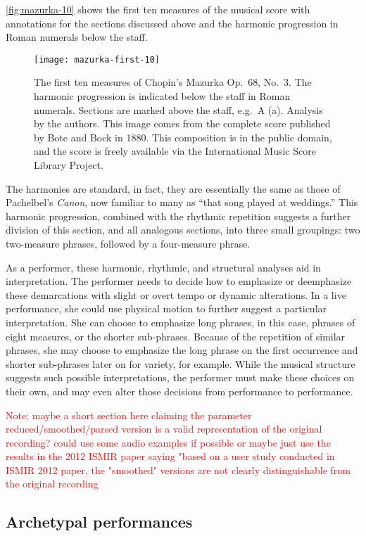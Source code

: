 \documentclass[12pt]{article}
\newcommand{\attn}[1]{\textcolor{red}{Note: #1}}
\begin{document}
\autoref{fig:mazurka-10} shows the first ten measures of the musical
score with annotations for the sections discussed above and the
harmonic progression in Roman numerals below the staff. 
\begin{figure}[t]
  \centering
  \texttt{[image: mazurka-first-10]}
  \caption{The first ten measures of Chopin's Mazurka Op.\ 68, No.\
    3. The harmonic progression is indicated below the staff in Roman
    numerals. Sections are marked above the staff, e.g.\ A
    (a). Analysis by the authors. This image comes from the complete
    score published by Bote and Bock in 1880. This composition is in
    the public domain, and the score is freely available via the
    International Music Score Library Project.}
  \label{fig:mazurka-10}
\end{figure}
The harmonies are standard, in fact, they are essentially the same as
those of Pachelbel's {\em Canon}, now familiar to many as ``that song
played at weddings.'' This harmonic progression, combined with the
rhythmic repetition suggests a further division of this section, and
all analogous sections, into three small groupings: two two-measure
phrases, followed by a four-measure phrase.

As a performer, these harmonic, rhythmic, and structural analyses aid
in interpretation. The performer needs to decide how to emphasize or
deemphasize these demarcations with slight or overt tempo or dynamic
alterations. In a live performance, she could use physical motion to
further suggest a particular interpretation. She can choose to
emphasize long phrases, in this 
case, phrases of eight measures, or the shorter sub-phrases. Because
of the repetition of similar phrases, she may choose to emphasize the
long phrase on the first occurrence and shorter sub-phrases later on
for variety, for example. While the musical structure suggests such
possible interpretations, the performer must make these choices on
their own, and may even alter those decisions from performance to
performance.



\attn{maybe a short section here claiming the parameter reduced/smoothed/parsed version is a valid representation of the original recording? could use some audio examples if possible
or maybe just use the results in the 2012 ISMIR paper saying "based on a user study conducted in ISMIR 2012 paper, the "smoothed" versions are not clearly distinguishable from the original recording}


\subsection{Archetypal performances}
\label{sec:arch-perf}
\end{document}
